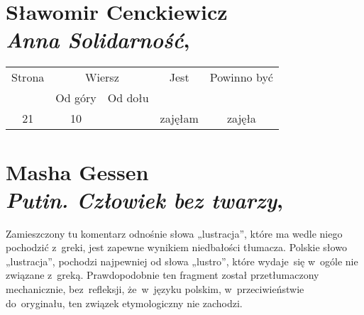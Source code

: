 \documentclass[a4paper,11pt]{article}
\numberwithin{equation}{section}
\begin{document}
\section{Sławomir Cenckiewicz \\
  \textit{Anna Solidarność},
  \cite{CenckiewiczAnnaSolidarnosc2010}}





\begin{center}

  \begin{tabular}{|c|c|c|c|c|}
    \hline
    Strona & \multicolumn{2}{c|}{Wiersz} & Jest
                              & Powinno być \\ \cline{2-3}
    & Od góry & Od dołu & & \\
    \hline
    21 & 10 & & zajęłam & zajęła \\
    \hline
  \end{tabular}

\end{center}

\VerSpaceTwo












\newpage

\section{Masha Gessen \\
  \textit{Putin. Człowiek bez twarzy},
  \cite{GessenPutinCzlowiekBezTwarzy2012}}


\vspace{0em}


\vspace{0em}


\noindent
{} Zamieszczony tu komentarz odnośnie słowa „lustracja”,
które ma
wedle niego pochodzić z~greki, jest zapewne wynikiem niedbałości tłumacza.
Polskie słowo „lustracja”, pochodzi najpewniej od słowa „lustro”, które
wydaje~się w~ogóle nie związane z~greką. Prawdopodobnie ten fragment został
przetłumaczony mechanicznie, bez~refleksji, że~w~języku polskim,
w~przeciwieństwie do~oryginału, ten związek etymologiczny nie zachodzi.
\end{document}
